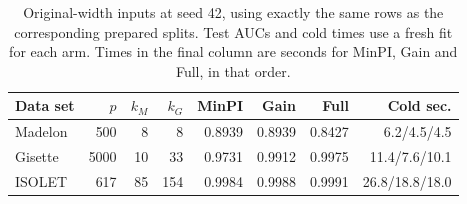 \begin{table}[tb]
\centering
\caption{Original-width inputs at seed 42, using exactly the same rows as the corresponding prepared splits. Test AUCs and cold times use a fresh fit for each arm. Times in the final column are seconds for MinPI, Gain and Full, in that order.}
\label{tab:width}
\small
\begin{tabular}{@{}lrrrrrrr@{}}
\toprule
Data set & $p$ & $k_{M}$ & $k_{G}$ & MinPI & Gain & Full & Cold sec. \\
\midrule
Madelon & 500 & 8 & 8 & 0.8939 & 0.8939 & 0.8427 & 6.2/4.5/4.5 \\
Gisette & 5000 & 10 & 33 & 0.9731 & 0.9912 & 0.9975 & 11.4/7.6/10.1 \\
ISOLET & 617 & 85 & 154 & 0.9984 & 0.9988 & 0.9991 & 26.8/18.8/18.0 \\
\bottomrule
\end{tabular}
\end{table}
